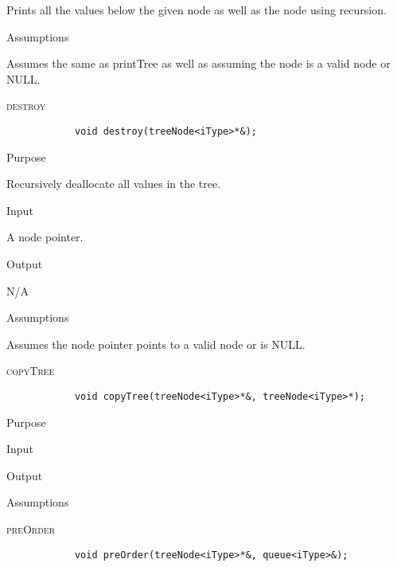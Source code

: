 \documentclass[pdftex, 12pt]{article}
\begin{document}
\begin{description}
\begin{description}
				Prints all the values below the given node as well as the node using recursion.

			\item{Assumptions}
			
				Assumes the same as printTree as well as assuming the node is a valid node or NULL.

		\end{description}
	\item{\textsc{destroy}}
		\begin{lstlisting}
			void destroy(treeNode<iType>*&);
		\end{lstlisting}
		\begin{description}

			\item{Purpose}

				Recursively deallocate all values in the tree.

			\item{Input}

				A node pointer.

			\item{Output}

				N/A

			\item{Assumptions}

				Assumes the node pointer points to a valid node or is NULL.

		\end{description}
	\item{\textsc{copyTree}}
		\begin{lstlisting}
			void copyTree(treeNode<iType>*&, treeNode<iType>*);
		\end{lstlisting}
		\begin{description}

			\item{Purpose}

			\item{Input}

			\item{Output}

			\item{Assumptions}

		\end{description}
	\item{\textsc{preOrder}}
		\begin{lstlisting}
			void preOrder(treeNode<iType>*&, queue<iType>&);
		\end{lstlisting}
		\begin{description}


\end{description}
\end{description}
\end{document}
